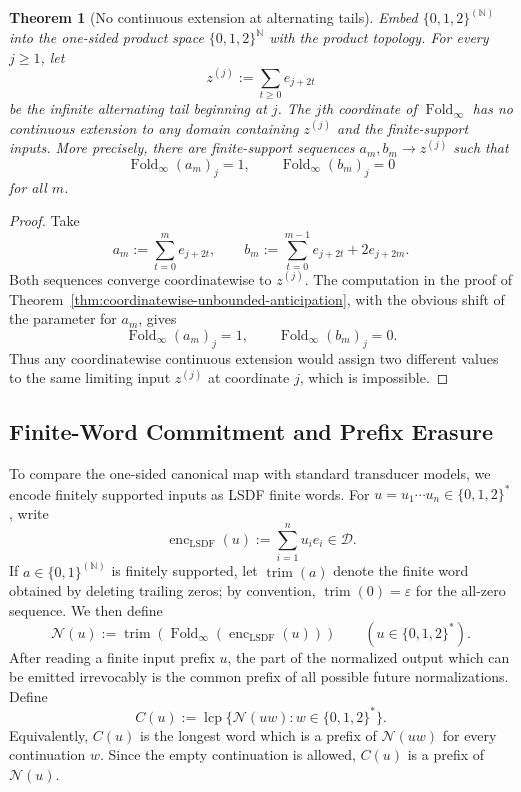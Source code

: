 \documentclass[11pt,letterpaper]{article}
\numberwithin{equation}{section}
\theoremstyle{plain}
\newtheorem{theorem}{Theorem}[section]
\theoremstyle{definition}
\theoremstyle{remark}
\newcommand{\D}{\mathcal{D}}
\newcommand{\NN}{\mathbb{N}}
\DeclareMathOperator{\Fold}{Fold}
\DeclareMathOperator{\lcp}{lcp}
\newcommand{\encLSDF}{\operatorname{enc}_{\mathrm{LSDF}}}
\begin{document}
\begin{theorem}[No continuous extension at alternating tails]\label{thm:no-continuous-extension}
Embed $\{0,1,2\}^{(\NN)}$ into the one-sided product space
$\{0,1,2\}^{\NN}$ with the product topology.  For every $j\ge 1$, let
\[
z^{(j)}:=\sum_{t\ge 0}e_{j+2t}
\]
be the infinite alternating tail beginning at $j$.  The $j$th coordinate of
$\Fold_\infty$ has no continuous extension to any domain containing
$z^{(j)}$ and the finite-support inputs.  More precisely, there are
finite-support sequences $a_m,b_m\to z^{(j)}$ such that
\[
\Fold_\infty(a_m)_j=1,\qquad \Fold_\infty(b_m)_j=0
\]
for all $m$.
\end{theorem}

\begin{proof}
Take
\[
a_m:=\sum_{t=0}^{m}e_{j+2t},
\qquad
b_m:=\sum_{t=0}^{m-1}e_{j+2t}+2e_{j+2m}.
\]
Both sequences converge coordinatewise to $z^{(j)}$.  The computation in the
proof of Theorem~\ref{thm:coordinatewise-unbounded-anticipation}, with the
obvious shift of the parameter for $a_m$, gives
\[
\Fold_\infty(a_m)_j=1,\qquad \Fold_\infty(b_m)_j=0.
\]
Thus any coordinatewise continuous extension would assign two different
values to the same limiting input $z^{(j)}$ at coordinate $j$, which is
impossible.
\end{proof}

\subsection{Finite-Word Commitment and Prefix Erasure}

To compare the one-sided canonical map with standard transducer models, we
encode finitely supported inputs as LSDF finite words.  For
$u=u_1\cdots u_n\in\{0,1,2\}^\ast$, write
\[
\encLSDF(u):=\sum_{i=1}^n u_i e_i\in \D.
\]
If $a\in\{0,1\}^{(\NN)}$ is finitely supported, let $\operatorname{trim}(a)$
denote the finite word obtained by deleting trailing zeros; by convention,
$\operatorname{trim}(0)=\varepsilon$ for the all-zero sequence.  We then define
\[
\mathcal N(u):=\operatorname{trim}(\Fold_\infty(\encLSDF(u)))
\qquad (u\in\{0,1,2\}^\ast).
\]
After reading a finite input prefix $u$, the part of the normalized output
which can be emitted irrevocably is the common prefix of all possible future
normalizations.  Define
\[
C(u):=\lcp\{\mathcal N(uw):w\in\{0,1,2\}^\ast\}.
\]
Equivalently, $C(u)$ is the longest word which is a prefix of
$\mathcal N(uw)$ for every continuation $w$.  Since the empty continuation is
allowed, $C(u)$ is a prefix of $\mathcal N(u)$.
\end{document}
